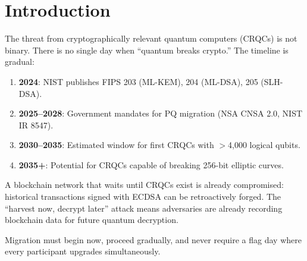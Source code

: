 \section{Introduction}


The threat from cryptographically relevant quantum computers (CRQCs) is not binary. There is no single day when ``quantum breaks crypto.'' The timeline is gradual:

\begin{enumerate}[leftmargin=2em]
\item \textbf{2024}: NIST publishes FIPS 203 (ML-KEM), 204 (ML-DSA), 205 (SLH-DSA).
\item \textbf{2025--2028}: Government mandates for PQ migration (NSA CNSA 2.0, NIST IR 8547).
\item \textbf{2030--2035}: Estimated window for first CRQCs with $>$4,000 logical qubits.
\item \textbf{2035+}: Potential for CRQCs capable of breaking 256-bit elliptic curves.
\end{enumerate}

A blockchain network that waits until CRQCs exist is already compromised: historical transactions signed with ECDSA can be retroactively forged. The ``harvest now, decrypt later'' attack means adversaries are already recording blockchain data for future quantum decryption.

Migration must begin now, proceed gradually, and never require a flag day where every participant upgrades simultaneously.

